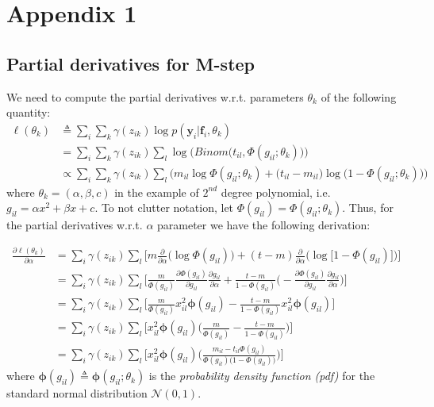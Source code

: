 \chapter{Appendix 1} \label{appendix1-ch}

\section{Partial derivatives for M-step} \label{derivatives-m-step-s}

We need to compute the partial derivatives w.r.t. parameters $\theta_{k}$ of the following quantity:
\begin{equation} \label{parameters-est2-EM-f-app}
  \begin{split}
	\ell(\theta_{k}) & \triangleq \sum_{i} \sum_{k} \gamma(z_{ik}) \log p(\mathbf{y}_{i}|\mathbf{f}_{i}, \theta_{k}) \\
					 & = \sum_{i} \sum_{k} \gamma(z_{ik}) \sum_{l} \log \bigg(Binom \big(t_{il}, \Phi(g_{il}; \theta_{k})\big) \bigg) \\
					 & \propto  \sum_{i} \sum_{k} \gamma(z_{ik}) \sum_{l} \bigg(m_{il} \log \Phi(g_{il}; \theta_{k}) + \big(t_{il} - m_{il} \big) \log \big(1 - \Phi(g_{il}; \theta_{k})\big)\bigg)
  \end{split}
\end{equation}
where $\theta_{k} = (\alpha, \beta, c)$ in the example of $2^{nd}$ degree polynomial, i.e. $g_{il} = \alpha x^{2} + \beta x + c$. To not clutter notation, let $\Phi(g_{il}) = \Phi(g_{il}; \theta_{k})$. Thus, for the partial derivatives w.r.t. $\alpha$ parameter we have the following derivation:

\begin{equation} \label{derivative-a-f-app}
  \begin{split}
	\frac{\partial \ell(\theta_{k})}{\partial \alpha} & = \sum_{i} \gamma(z_{ik}) \sum_{l} \bigg[ m \frac{\partial}{\partial \alpha}\big(\log \Phi(g_{il})\big) + (t-m) \frac{\partial}{\partial \alpha}\big(\log \big[1 - \Phi(g_{il})\big]\big)\bigg] \\
		& = \sum_{i} \gamma(z_{ik}) \sum_{l} \bigg[ \frac{m}{\Phi(g_{il})} \frac{\partial \Phi(g_{il})}{\partial g_{il}} \frac{\partial g_{il}}{\partial \alpha} + \frac{t - m}{1 - \Phi(g_{il})}\bigg( -\frac{\partial \Phi(g_{il})}{\partial g_{il}} \frac{\partial g_{il}}{\partial \alpha} \bigg) \bigg] \\
		& = \sum_{i} \gamma(z_{ik}) \sum_{l} \bigg[ \frac{m}{\Phi(g_{il})} x_{il}^{2} \mathbf{\phi}(g_{il}) - \frac{t - m}{1 - \Phi(g_{il})} x_{il}^{2} \mathbf{\phi}(g_{il}) \bigg]\\
		& = \sum_{i}  \gamma(z_{ik}) \sum_{l} \bigg[ x_{il}^{2} \mathbf{\phi}(g_{il})\bigg(\frac{m}{\Phi(g_{il})} - \frac{t - m}{1 - \Phi(g_{il})}\bigg) \bigg] \\
		& = \sum_{i}  \gamma(z_{ik}) \sum_{l} \bigg[ x_{il}^{2} \mathbf{\phi}(g_{il})\bigg(\frac{m_{il} - t_{il}\Phi(g_{il})}{\Phi(g_{il})\big(1-\Phi(g_{il})\big)} \bigg) \bigg]
	\end{split}
\end{equation}
where $\mathbf{\phi}(g_{il}) \triangleq \mathbf{\phi}(g_{il};\theta_{k})$ is the \emph{probability density function (pdf)} for the standard normal distribution $\mathcal{N}(0,1)$.

